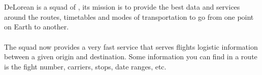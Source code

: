 \section{\squad}

DeLorean\cite{delorean_squad_home} is a squad of \tribe, its mission is to provide the best data and services around the routes, timetables and modes of transportation to go from one point on Earth to another.
\\\\
The squad now provides a very fast service that serves flights logistic information between a given origin and destination. Some information you can find in a route is the fight number, carriers, stops, date ranges, etc.